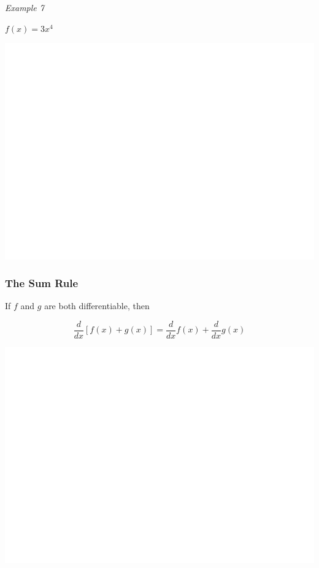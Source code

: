 \documentclass[]{book}
\begin{document}
\emph{Example 7}

\(f(x)=3x^4\)

\begin{center}\includegraphics[width=1\linewidth]{figure/LB11-1} \end{center}

\hypertarget{the-sum-rule}{%
\subsubsection{The Sum Rule}\label{the-sum-rule}}

If \(f\) and \(g\) are both differentiable, then

\[\frac{d}{dx}[f(x)+g(x)]= \frac{d}{dx}f(x)+ \frac{d}{dx}g(x)\]

\begin{center}\includegraphics[width=1\linewidth]{figure/LB12-1} \end{center}
\end{document}
